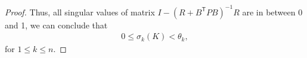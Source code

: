 \documentclass{article}
\newcommand{\transpose}{\mathsf{T}}
\begin{document}
\begin{proof}
    Thus, all singular values of matrix $I - (R+B^{\transpose}PB)^{-1}R$ are in between 0 and 1, we can conclude that
    \begin{align}
        0 \leq \sigma_{k}(K) < \theta_{k},
    \end{align}
    for $1\leq k \leq n$.
    
    

\end{proof}
\end{document}
